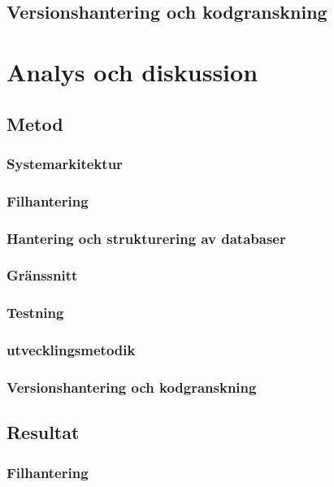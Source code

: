 \documentclass[a4paper,12pt,oneside,final]{extbook}
\begin{document}
\section{Versionshantering och kodgranskning}

\chapter{Analys och diskussion}

\section{Metod}

\subsection{Systemarkitektur}

\subsection{Filhantering}

\subsection{Hantering och strukturering av databaser}

\subsection{Gränssnitt}

\subsection{Testning}

\subsection{utvecklingsmetodik}

\subsection{Versionshantering och kodgranskning}

\section{Resultat}

\subsection{Filhantering}
\end{document}
